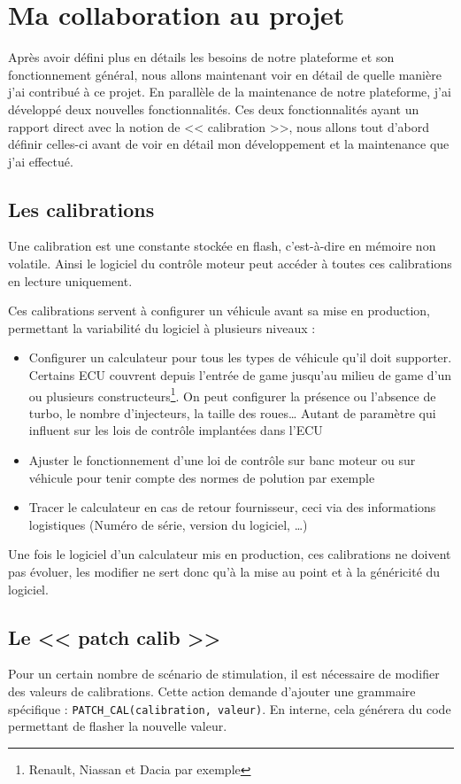 \chapter{Ma collaboration au projet}\label{collab}
\putminitoc
Après avoir défini plus en détails les besoins de notre plateforme et son fonctionnement général, nous allons maintenant voir en détail de quelle manière j'ai contribué à ce projet. En parallèle de la maintenance de notre plateforme, j'ai développé deux nouvelles fonctionnalités. Ces deux fonctionnalités ayant un rapport direct avec la notion de << calibration >>, nous allons tout d'abord définir celles-ci avant de voir en détail mon développement et la maintenance que j'ai effectué.

\section{Les calibrations}
Une calibration est une constante stockée en flash, c'est-à-dire en mémoire non volatile. Ainsi le logiciel du contrôle moteur peut accéder à toutes ces calibrations en lecture uniquement.

Ces calibrations servent à configurer un véhicule avant sa mise en production, permettant la variabilité du logiciel à plusieurs niveaux : 
\begin{itemize}
	\item Configurer un calculateur pour tous les types de véhicule qu'il doit supporter. Certains ECU couvrent depuis l'entrée de game jusqu'au milieu de game d'un ou plusieurs constructeurs\footnote{Renault, Niassan et Dacia par exemple}. On peut configurer la présence ou l'absence de turbo, le nombre d'injecteurs, la taille des roues\ldots\newline
	 Autant de paramètre qui influent sur les lois de contrôle implantées dans l'ECU
	\item Ajuster le fonctionnement d'une loi de contrôle sur banc moteur ou sur véhicule pour tenir compte des normes de polution par exemple
	\item Tracer le calculateur en cas de retour fournisseur, ceci via des informations logistiques (Numéro de série, version du logiciel, \ldots)
\end{itemize}

Une fois le logiciel d'un calculateur mis en production, ces calibrations ne doivent pas évoluer, les modifier ne sert donc qu'à la mise au point et à la généricité du logiciel.
\vfill
\section{Le << patch calib >>}\label{patch}
Pour un certain nombre de scénario de stimulation, il est nécessaire de modifier des valeurs de calibrations. Cette action demande d'ajouter une grammaire spécifique : \texttt{PATCH\_CAL(calibration, valeur)}. En interne, cela générera du code permettant de flasher la nouvelle valeur.
%

